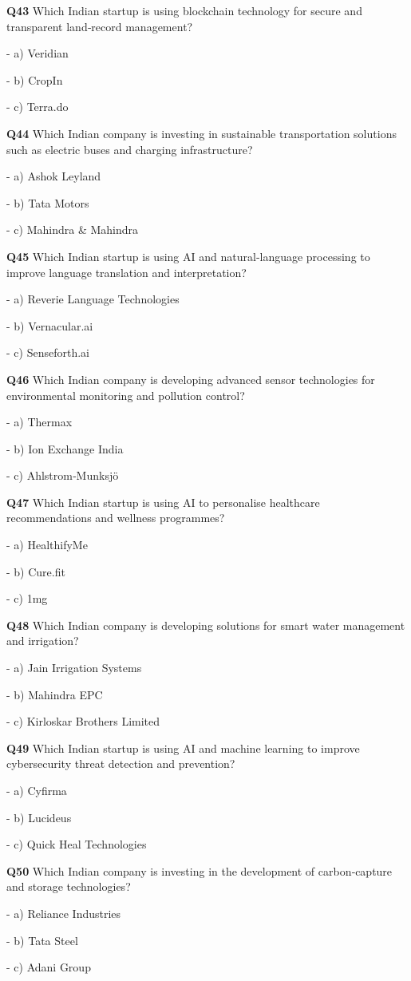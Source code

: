 \textbf{Q43} Which Indian startup is using blockchain technology for secure and transparent land‑record management?\par
\quad - a) Veridian\par
\quad - b) CropIn\par
\quad - c) Terra.do\par

\textbf{Q44} Which Indian company is investing in sustainable transportation solutions such as electric buses and charging infrastructure?\par
\quad - a) Ashok Leyland\par
\quad - b) Tata Motors\par
\quad - c) Mahindra & Mahindra\par

\textbf{Q45} Which Indian startup is using AI and natural‑language processing to improve language translation and interpretation?\par
\quad - a) Reverie Language Technologies\par
\quad - b) Vernacular.ai\par
\quad - c) Senseforth.ai\par

\textbf{Q46} Which Indian company is developing advanced sensor technologies for environmental monitoring and pollution control?\par
\quad - a) Thermax\par
\quad - b) Ion Exchange India\par
\quad - c) Ahlstrom‑Munksjö\par

\textbf{Q47} Which Indian startup is using AI to personalise healthcare recommendations and wellness programmes?\par
\quad - a) HealthifyMe\par
\quad - b) Cure.fit\par
\quad - c) 1mg\par

\textbf{Q48} Which Indian company is developing solutions for smart water management and irrigation?\par
\quad - a) Jain Irrigation Systems\par
\quad - b) Mahindra EPC\par
\quad - c) Kirloskar Brothers Limited\par

\textbf{Q49} Which Indian startup is using AI and machine learning to improve cybersecurity threat detection and prevention?\par
\quad - a) Cyfirma\par
\quad - b) Lucideus\par
\quad - c) Quick Heal Technologies\par

\textbf{Q50} Which Indian company is investing in the development of carbon‑capture and storage technologies?\par
\quad - a) Reliance Industries\par
\quad - b) Tata Steel\par
\quad - c) Adani Group\par
